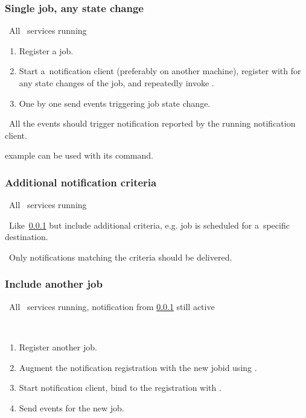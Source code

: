 \subsubsection{Single job, any state change}
\label{notif1}
\req\ All \LB\ services running

\what
\begin{enumerate}
\item Register a job.
\item Start a~notification client (preferably on another machine),
register with  for any state changes of the job,
and repeatedly invoke .
\item One by one send events triggering job state change.
\end{enumerate}

\result\ All the events should trigger notification reported by the running
notification client.

\begin{hints}
 example can be used with its  command.
\end{hints}



\subsubsection{Additional notification criteria}
\label{notif-complex}
\req\ All \LB\ services running

\how\ Like~\ref{notif1} but include additional criteria,
e.g. job is scheduled for a~specific destination.

\result\ Only notifications matching the criteria should be delivered.




\subsubsection{Include another job}
\label{notif2}
\req\ All \LB\ services running, notification from \ref{notif1} still active

\how\
\begin{enumerate}
\item Register another job.
\item Augment the notification registration with the new jobid using
\code{edg\_wll\_NotifChange}.
\item Start notification client, bind to the registration with
.
\item Send events for the new job.
\end{enumerate}

